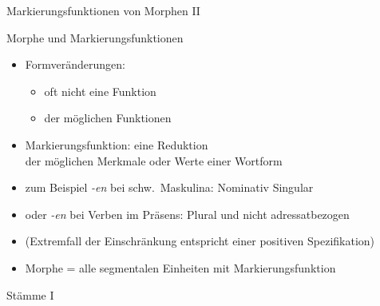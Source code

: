 \begin{frame}
  {Markierungsfunktionen von Morphen II}
  \pause
  \begin{exe}
    \ex
    \begin{xlist}
    \end{xlist}
  \end{exe}
\end{frame}

\begin{frame}
  {Morphe und Markierungsfunktionen}
  \pause
  \begin{itemize}[<+->]
    \item Formveränderungen:
      \begin{itemize}[<+->]
        \item oft nicht \alert{eine} Funktion
        \item {} der möglichen Funktionen
      \end{itemize}
   \Halbzeile 
    \item \alert{Markierungsfunktion}: eine \alert{Reduktion}\\
      der möglichen Merkmale oder Werte einer Wortform
    \item zum Beispiel \textit{-en} bei schw.\ Maskulina:  Nominativ Singular
    \item oder \textit{-en} bei Verben im Präsens: Plural und nicht adressatbezogen
      \Halbzeile
    \item (Extremfall der Einschränkung entspricht einer positiven Spezifikation)
      \Halbzeile
    \item \alert{Morphe = alle segmentalen Einheiten mit Markierungsfunktion}
  \end{itemize}
\end{frame}

\begin{frame}
  {Stämme I}
  \pause
  \begin{exe}
    \ex
    \begin{xlist}
        \pause
        \pause
    \end{xlist}
  \end{exe}
\end{frame}

